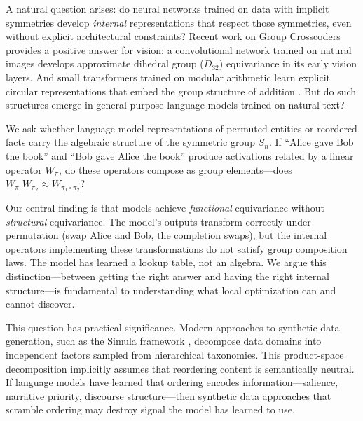 \documentclass[10pt, letterpaper]{article}
\begin{document}
A natural question arises: do neural networks trained on data with implicit symmetries develop \emph{internal} representations that respect those symmetries, even without explicit architectural constraints? Recent work on Group Crosscoders \cite{gorton2024group} provides a positive answer for vision: a convolutional network trained on natural images develops approximate dihedral group ($D_{32}$) equivariance in its early vision layers. And small transformers trained on modular arithmetic learn explicit circular representations that embed the group structure of addition \cite{nanda2023grokking}. But do such structures emerge in general-purpose language models trained on natural text?

We ask whether language model representations of permuted entities or reordered facts carry the algebraic structure of the symmetric group $S_n$. If ``Alice gave Bob the book'' and ``Bob gave Alice the book'' produce activations related by a linear operator $W_\pi$, do these operators compose as group elements---does $W_{\pi_1} W_{\pi_2} \approx W_{\pi_1 \circ \pi_2}$?

Our central finding is that models achieve \emph{functional} equivariance without \emph{structural} equivariance. The model's outputs transform correctly under permutation (swap Alice and Bob, the completion swaps), but the internal operators implementing these transformations do not satisfy group composition laws. The model has learned a lookup table, not an algebra. We argue this distinction---between getting the right answer and having the right internal structure---is fundamental to understanding what local optimization can and cannot discover.

This question has practical significance. Modern approaches to synthetic data generation, such as the Simula framework \cite{davidson2026simula}, decompose data domains into independent factors sampled from hierarchical taxonomies. This product-space decomposition implicitly assumes that reordering content is semantically neutral. If language models have learned that ordering encodes information---salience, narrative priority, discourse structure---then synthetic data approaches that scramble ordering may destroy signal the model has learned to use.
\end{document}
